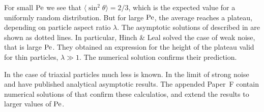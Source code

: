 \documentclass[thesis.tex]{subfiles}
\begin{document}
For small $\mbox{Pe}$ we see that $\langle \sin^2\theta \rangle = 2/3$, which is the expected value for a uniformly random distribution. But for large $\mbox{Pe}$, the average reaches a plateau, depending on particle aspect ratio $\lambda$. The asymptotic solutions of  described in \cite{brenner1974} are shown as dotted lines. In particular, Hinch \& Leal \cite{hinch1972} solved the case of weak noise, that is large $\mbox{Pe}$. They obtained an expression for the height of the plateau valid for thin particles, $\lambda\gg1$. The numerical solution confirms their prediction.

In the case of triaxial particles much less is known. In the limit of strong noise \citet{rallison1978} and \citet{haber1984} have published analytical asymptotic results. The appended Paper~F contain numerical solutions of  that confirm these calculatios, and extend the results to larger values of $\mbox{Pe}$.
\end{document}
